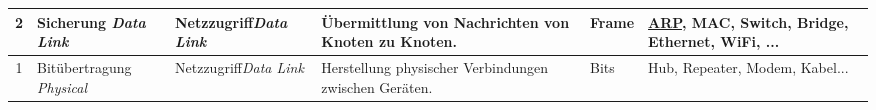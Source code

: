 \documentclass[border=10pt]{standalone}
\begin{document}
\begin{tabular}{c|m{2.6cm}||m{2cm}||m{4.6cm}|m{2.5cm}|m{2cm}}
		\rowcolor{dataLinkLayerColor!30}2      & Sicherung \newline \textit{Data Link}      & Netzzugriff\newline\textit{Data Link} & \"Ubermittlung von Nachrichten von Knoten zu Knoten.                                                              & Frame                                     & \underline{ARP}, MAC, Switch, Bridge, Ethernet, WiFi, ...      \\\midrule
		\rowcolor{dataLinkLayerColor!15}1      & Bit\"ubertragung \newline \textit{Physical}  & Netzzugriff\newline\textit{Data Link} & Herstellung physischer Verbindungen zwischen Ger\"aten.                                                           & Bits                                      & Hub, Repeater, Modem, Kabel...        \\
	\end{tabular}
\end{document}
